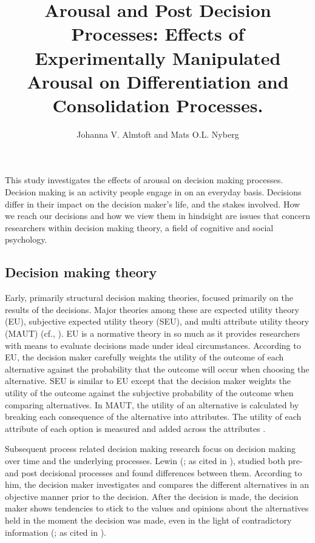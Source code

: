\documentclass[jou,draftfirst,11pt]{apa6}
\title{Arousal and Post Decision Processes: Effects of Experimentally
  Manipulated Arousal on Differentiation and Consolidation Processes.}
\author{Johanna V. Almtoft and Mats O.L. Nyberg}
\affiliation{Departement of Psychology, University of Lund}
\begin{document}
\maketitle


This study investigates the effects of arousal on decision making
processes.  Decision making is an activity people engage in on an
everyday basis.  Decisions differ in  their impact on the decision
maker's life, and the stakes involved.  How we reach our decisions and
how we view them in hindsight are issues that concern researchers
within decision making theory, a field of cognitive and social
psychology.


\subsection{Decision making theory}

Early, primarily structural decision making theories, focused
primarily on the results of the decisions.  Major theories among these
are expected utility theory (EU),  subjective expected utility theory
(SEU), and multi attribute utility theory (MAUT) (cf., \cite{baron94}).
EU is a normative theory in so much as it provides researchers with
means to evaluate decisions made under ideal circumstances.  According
to EU, the decision maker carefully weights the utility of the outcome
of each alternative against the probability that the outcome will
occur when choosing the alternative.  SEU is similar to EU except that
the decision maker weights the utility of the outcome against the
subjective probability of the outcome when comparing alternatives.  In
MAUT, the utility of an alternative is calculated by breaking each
consequence of the alternative into attributes.  The utility of each
attribute of each option is measured and added across the attributes
\parencite{baron94}.

Subsequent process related decision making research focus on decision
making over time and the underlying processes. Lewin (\cite{lewin51}; as
cited in \cite{festinger64}), studied both pre- and post decisional
processes and found differences between them.  According to him, the
decision maker investigates and compares the different alternatives in
an objective manner prior to the decision.  After the decision is
made, the decision maker shows tendencies to stick to the values and
opinions about the alternatives held in the moment the decision was
made, even in the light of contradictory information (\cite{lewin51}; as
cited in \cite{festinger64}).
\end{document}
